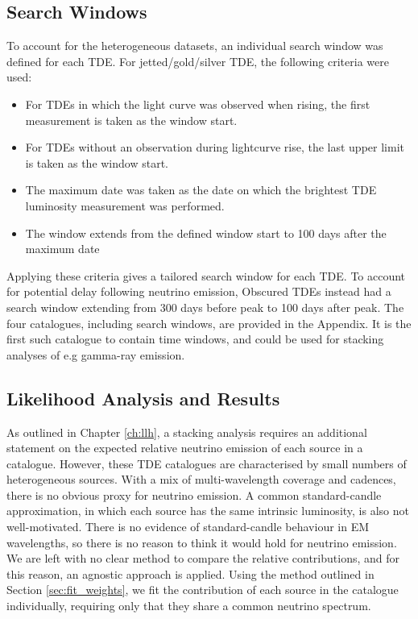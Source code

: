 \subsection{Search Windows}

To account for the heterogeneous datasets, an individual search window was defined for each TDE. For jetted/gold/silver TDE, the following criteria were used:

\begin{itemize}
	\item For TDEs in which the light curve was observed when rising, the first measurement is taken as the window start.
	
	\item For TDEs without an observation during lightcurve rise, the last upper limit is taken as the window start.
	
	\item The maximum date was taken as the date on which the brightest TDE luminosity measurement was performed.
	
	\item The window extends from the defined window start to 100 days after the maximum date
	
\end{itemize}

Applying these criteria gives a tailored search window for each TDE. To account for potential delay following neutrino emission, Obscured TDEs instead had a search window extending from 300 days before peak to 100 days after peak. The four catalogues, including search windows, are provided in the Appendix. It is the first such catalogue to contain time windows, and could be used for stacking analyses of e.g gamma-ray emission.

\subsection{Likelihood Analysis and Results}

As outlined in Chapter \ref{ch:llh}, a stacking analysis requires an additional statement on the expected relative neutrino emission of each source in a catalogue. However, these TDE catalogues are characterised by small numbers of heterogeneous sources. With a mix of multi-wavelength coverage and cadences, there is no obvious proxy for neutrino emission. A common standard-candle approximation, in which each source has the same intrinsic luminosity, is also not well-motivated. There is no evidence of standard-candle behaviour in EM wavelengths, so there is no reason to think it would hold for neutrino emission. We are left with no clear method to compare the relative contributions, and for this reason, an agnostic approach is applied. Using the method outlined in Section \ref{sec:fit_weights}, we fit the contribution of each source in the catalogue individually, requiring only that they share a common neutrino spectrum.

